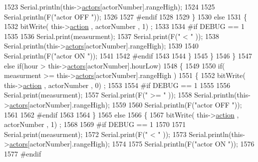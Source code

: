 \begin{DoxyCode}
1523                 Serial.println(this->\hyperlink{class_jetpack_a7e16d2f97837f9712a2e6de1c50d99db}{actors}[actorNumber].rangeHigh);
1524 
1525                 Serial.println(F(\textcolor{stringliteral}{"actor OFF "}));
1526 
1527 \textcolor{preprocessor}{            #endif  }
1528 
1529             \}
1530             \textcolor{keywordflow}{else} 
1531             \{
1532                 bitWrite( this->\hyperlink{class_jetpack_aca3142925a7b0834b34ae91d26af7765}{action} , actorNumber , 1) ;
1533 
1534 \textcolor{preprocessor}{            #if DEBUG == 1 }
1535 
1536                 Serial.print(measurment);
1537                 Serial.print(F(\textcolor{stringliteral}{" < "} ));
1538                 Serial.println(this->\hyperlink{class_jetpack_a7e16d2f97837f9712a2e6de1c50d99db}{actors}[actorNumber].rangeHigh);
1539 
1540                 Serial.println(F(\textcolor{stringliteral}{"actor ON "}));
1541 
1542 \textcolor{preprocessor}{            #endif  }
1543                 
1544             \}
1545         \}
1546     \}
1547     \textcolor{keywordflow}{else} \textcolor{keywordflow}{if}(hour > this->\hyperlink{class_jetpack_a7e16d2f97837f9712a2e6de1c50d99db}{actors}[actorNumber].hourLow)
1548     \{
1549 
1550         \textcolor{keywordflow}{if}( measurment >= this->\hyperlink{class_jetpack_a7e16d2f97837f9712a2e6de1c50d99db}{actors}[actorNumber].rangeHigh )
1551         \{
1552             bitWrite( this->\hyperlink{class_jetpack_aca3142925a7b0834b34ae91d26af7765}{action} , actorNumber , 0) ;
1553 
1554 \textcolor{preprocessor}{        #if DEBUG == 1 }
1555 
1556             Serial.print(measurment);
1557             Serial.print(F(\textcolor{stringliteral}{" >= "} ));
1558             Serial.println(this->\hyperlink{class_jetpack_a7e16d2f97837f9712a2e6de1c50d99db}{actors}[actorNumber].rangeHigh);
1559 
1560             Serial.println(F(\textcolor{stringliteral}{"actor OFF "}));
1561 
1562 \textcolor{preprocessor}{        #endif  }
1563 
1564         \}
1565         \textcolor{keywordflow}{else} 
1566         \{
1567             bitWrite( this->\hyperlink{class_jetpack_aca3142925a7b0834b34ae91d26af7765}{action} , actorNumber , 1) ;
1568 
1569 \textcolor{preprocessor}{        #if DEBUG == 1 }
1570 
1571             Serial.print(measurment);
1572             Serial.print(F(\textcolor{stringliteral}{" < "} ));
1573             Serial.println(this->\hyperlink{class_jetpack_a7e16d2f97837f9712a2e6de1c50d99db}{actors}[actorNumber].rangeHigh);
1574 
1575             Serial.println(F(\textcolor{stringliteral}{"actor ON "}));
1576 
1577 \textcolor{preprocessor}{        #endif  }

\end{DoxyCode}
